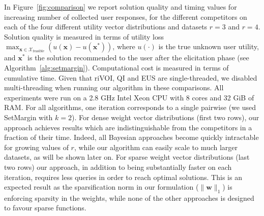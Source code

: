 \documentclass{article}
\renewcommand\[{\begin{equation}}
\renewcommand\]{\end{equation}}
\newcommand{\calvar}[1]{\ensuremath{\mathcal{#1}}}
\newcommand{\calX}{\calvar{X}}
\newcommand{\vecvar}[1]{\ensuremath{\boldsymbol{#1}}}
\newcommand{\vw}{\vecvar{w}}
\newcommand{\vx}{\vecvar{x}}
\newcommand{\andrea}[1]{{\bf \textcolor{blue}{{\fbox{Andrea:} #1}}}}
\begin{document}
In Figure~\ref{fig:comparison} we report solution quality and timing
values for increasing number of collected user responses, for the
different competitors on each of the four different utility vector
distributions and datasets $r=3$ and $r=4$. Solution quality is
measured in terms of utility loss $ \max_{\vx\in\calX_\text{feasible}} \left( u(\vx) - u(\vx^*) \right)$,
where $u(\cdot)$ is the true unknown user utility, and $\vx^*$ is the
solution recommended to the user after the elicitation phase (see
Algorithm~\ref{alg:setmargin}). Computational cost is measured in
terms of cumulative time. Given that {\sc riVOI},  {\sc QI} and
{\sc EUS} are single-threaded, we disabled multi-threading when running our
algorithm in these comparisons. All experiments were run on a 2.8 GHz Intel
Xeon CPU with 8 cores and 32 GiB of RAM.
For all algorithms, one iteration corresponds to a single pairwise (we
used {\sc SetMargin} with $k=2$).
For dense weight vector distributions (first two rows), our approach
achieves results which are indistinguishable from the competitors in a
fraction of their time.  Indeed, all Bayesian approaches%
 become quickly intractable for growing values of $r$,
while our algorithm can easily scale to much larger datasets, as will
be shown later on. For sparse weight vector distributions (last two
rows) our approach, in addition to being substantially faster on each
iteration, requires less queries in order to reach optimal
solutions. This is an expected result as the sparsification norm in
our formulation ($\| \vw \|_1$) is enforcing sparsity in the weights, 
while none of the other approaches is %
designed to favour sparse functions.


\end{document}
